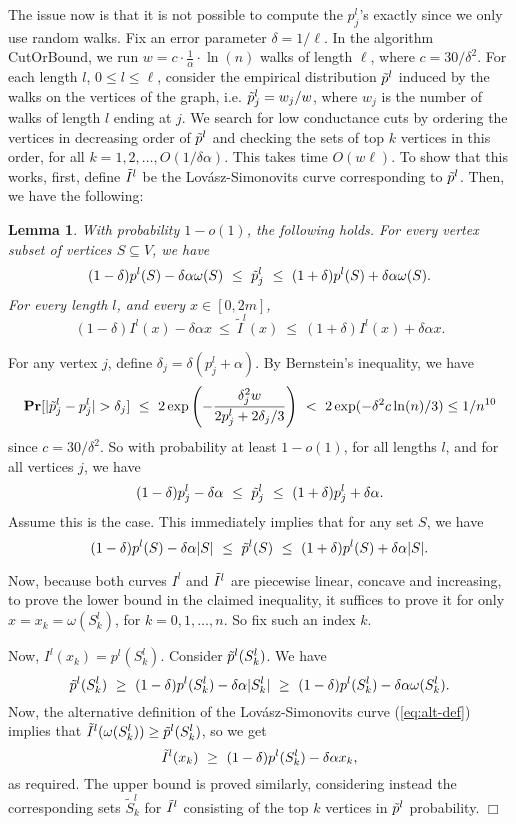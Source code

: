 \documentclass[11pt]{article}
\newtheorem{Lem}[theorem]{Lemma}
\newenvironment{myproof}{\noindent {\sc Proof:}}{$\Box$}
\newcommand\pr{\mbox{\bf Pr}}
\newcommand\CutOrBound{{\sc CutOrBound}\xspace}
\newcommand\volls{\omega}
\begin{document}
The issue now is that it is not possible to compute the $p^l_j$'s exactly since we only use random walks. Fix an error parameter $\delta = 1/\ell$. In the algorithm \CutOrBound, we run $w = c\cdot \frac{1}{\alpha} \cdot \ln(n)$ walks of length $\ell$, where $c = 30/\delta^2$. For each length
$l$, $0 \leq l \leq \ell$, consider the empirical distribution $\tilde{p}^l$
induced by the walks on the vertices of the graph, i.e. $\tilde{p}^l_j = w_j/w$, where $w_j$ is the number of walks of length $l$ ending at $j$. We search for low conductance cuts by ordering the vertices in decreasing order of $\tilde{p}^l$ and checking the sets of top $k$ vertices in this order, for all $k = 1, 2, \ldots, O(1/\delta\alpha)$. This takes time $O(w \ell)$. To show that this works,
first, define $\tilde{I}^l$ be the Lov\'{a}sz-Simonovits curve corresponding to
$\tilde{p}^l$. Then, we have the following:
\begin{Lem} \label{lem:concentration-ptil}
With probability $1 - o(1)$, the following
holds. For every vertex subset of vertices $S \subseteq V$, we have
$$(1-\delta)p^l(S) - \delta\alpha\volls(S)\ \leq\ \ptil^l_j\ \leq\ (1+\delta)p^l(S) + \delta\alpha\volls(S).$$
For every length $l$, and every $x \in [0, 2m]$,
$$(1-\delta)I^l(x) - \delta\alpha x\ \leq\ \tilde{I}^l(x)\ \leq\ (1+\delta)I^l(x) + \delta\alpha x.$$
\end{Lem}
\begin{myproof}
For any vertex $j$, define $\delta_j = \delta(p^l_j + \alpha)$. By Bernstein's
inequality, we have $$\pr[|\ptil^l_j - p^l_j| > \delta_j]\ \leq\
2\exp\left(-\frac{\delta_j^2w}{2p^l_j + 2\delta_j/3}\right)\ <\
2\exp(-\delta^2c\ln(n)/3) \leq 1/n^{10}$$ since $c = 30/\delta^2$. So
with probability at least $1 - o(1)$, for all lengths $l$, and for all vertices
$j$, we have $$(1-\delta)p^l_j - \delta\alpha\ \leq\ \ptil^l_j\ \leq\
(1+\delta)p^l_j + \delta\alpha.$$ Assume this is the case. This immediately
implies that for any set $S$, we have $$(1-\delta)p^l(S) - \delta\alpha|S|\
\leq\ \tilde{p}^l(S)\ \leq\ (1+\delta)p^l(S) + \delta\alpha|S|.$$

Now, because both curves $I^l$ and $\tilde{I}^l$ are piecewise linear, concave and
increasing, to prove the lower bound in the claimed inequality, it suffices to
prove it for only $x = x_k = \volls(S^l_k)$, for $k = 0, 1, \ldots, n$. So fix
such an index $k$.

Now, $I^l(x_k) = p^l(S^l_k)$. Consider $\tilde{p}^l(S^l_k)$. We have
$$\ptil^l(S^l_k)\ \geq\ (1-\delta)p^l(S^l_k) - \delta\alpha|S^l_k|\ \geq\
(1-\delta)p^l(S^l_k) - \delta\alpha\volls(S^l_k).$$ Now, the alternative
definition of the Lov\'{a}sz-Simonovits curve (\ref{eq:alt-def}) implies that
$\Itil^l(\volls(S^l_k)) \geq \ptil^l(S^l_k)$, so we get $$\tilde{I}^l(x_k)\ \geq\
(1-\delta)p^l(S^l_k) - \delta\alpha x_k,$$ as required. The upper bound is
proved similarly, considering instead the corresponding sets $\tilde{S}^l_k$
for $\tilde{I}^l$ consisting of the top $k$ vertices in $\tilde{p}^l$ probability.
\end{myproof}
\end{document}

